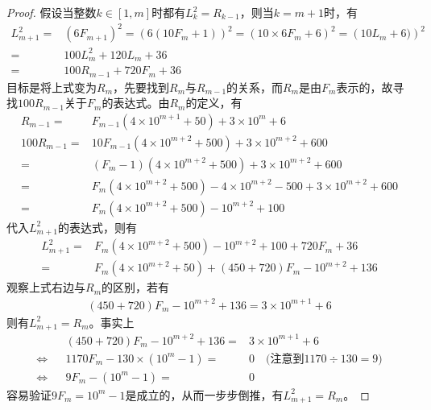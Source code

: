 \begin{proof}
  假设当整数$k\in[1, m]$时都有$L_k^2 = R_{k-1}$，则当$k=m+1$时，有
  \begin{align*}
    L_{m+1}^2 ={}& \left(6F_{m+1}\right)^2 = \left(6(10F_m+1) \right)^2 = \left( 10\times 6F_m + 6 \right)^2 = \left( 10L_m + 6 )\right)^2 \\
             ={}& 100L_m^2 + 120L_m + 36\\
             ={}& 100R_{m-1} + 720F_m + 36
  \end{align*}
  目标是将上式变为$R_m$，先要找到$R_m$与$R_{m-1}$的关系，而$R_m$是由$F_m$表示的，故寻找$100R_{m-1}$关于$F_m$的表达式。由$R_m$的定义，有
  \begin{align*}
    R_{m-1} ={}& F_{m-1}\left(4\times10^{m+1} + 50\right) + 3\times 10^{m} + 6\\
    100R_{m-1} ={}& 10F_{m-1} \left( 4\times10^{m+2} + 500\right) + 3\times10^{m+2} + 600\\
              ={}& (F_m-1) \left( 4\times10^{m+2} + 500\right) + 3\times10^{m+2} + 600\\
              ={}& F_m\left( 4\times10^{m+2} + 500\right) - 4\times10^{m+2} - 500 + 3\times10^{m+2} + 600\\
              ={}& F_m\left( 4\times10^{m+2} + 500\right) - 10^{m+2} + 100
  \end{align*}
  代入$L_{m+1}^2$的表达式，则有
  \begin{align*}
    L_{m+1}^2 ={}& F_m\left( 4\times10^{m+2} + 500\right) - 10^{m+2} + 100 + 720F_m + 36\\
             ={}& F_m\left( 4\times10^{m+2} + 50 \right) + (450 + 720)F_m - 10^{m+2} + 136
  \end{align*}
  观察上式右边与$R_m$的区别，若有
  \begin{align*}
    (450 + 720)F_m - 10^{m+2} + 136 = 3\times10^{m+1} + 6
  \end{align*}
  则有$L_{m+1}^2 = R_m$。事实上
  \begin{align*}
         &&(450 + 720)F_m - 10^{m+2} + 136 ={}& 3\times10^{m+1} + 6\\
    \iff && 1170F_m - 130\times(10^m - 1) ={}& 0 \quad\text{(注意到$1170\div130=9)$}\\
    \iff &&           9F_m - (10^{m} - 1) ={}& 0
  \end{align*}
  容易验证$9F_m = 10^m - 1$是成立的，从而一步步倒推，有$L_{m+1}^2 = R_m$。
\end{proof}


